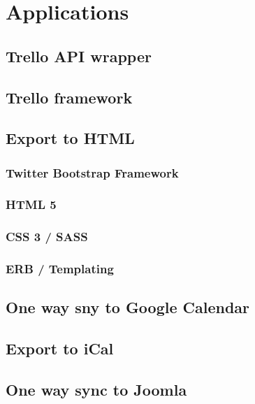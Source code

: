 
\chapter{Applications}
  \label{Discussion}

\section{Trello API wrapper}

\section{Trello framework}

\section{Export to HTML}

\subsection{Twitter Bootstrap Framework}

\subsection{HTML 5}

\subsection{CSS 3 / SASS}

\subsection{ERB / Templating}

\section{One way sny to Google Calendar}

\section{Export to iCal}

\section{One way sync to Joomla}

